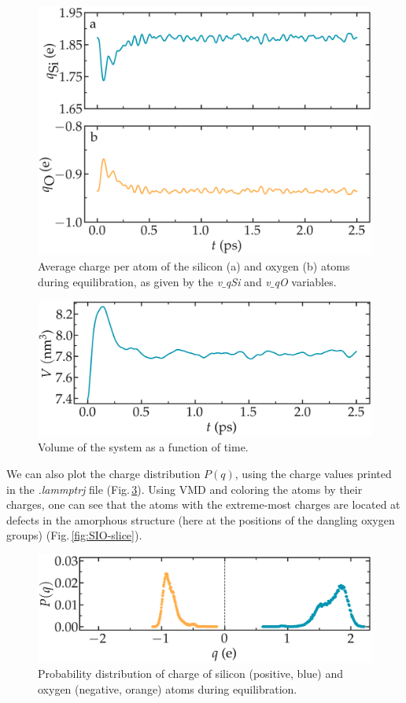 \documentclass[9pt,tutorial]{livecoms}
\begin{document}
\begin{figure}
\centering
\includegraphics[width=\linewidth]{SIO-charge}
\caption{Average charge per atom of the silicon (a) and oxygen (b) atoms during equilibration, as given by the \textit{v$\_$qSi} and \textit{v$\_$qO} variables.}
\label{fig:SIO-charge}
\end{figure}

\begin{figure}
\includegraphics[width=\linewidth]{SIO-volume}
\caption{Volume of the system as a function of time.}
\label{fig:SIO-volume}
\end{figure}

We can also plot the charge distribution $P(q)$, using the charge values printed in the \textit{.lammptrj} file (Fig.\,\ref{fig:SIO-distribution}). Using VMD and coloring the atoms by their charges, one can see that the atoms with the extreme-most charges are located at defects in the amorphous structure (here at the positions of the dangling oxygen groups) (Fig.\,\ref{fig:SIO-slice}).

\begin{figure}
\includegraphics[width=\linewidth]{SIO-distribution}
\caption{Probability distribution of charge of silicon (positive, blue) and oxygen (negative, orange) atoms during equilibration.}
\label{fig:SIO-distribution}
\end{figure}
\end{document}
